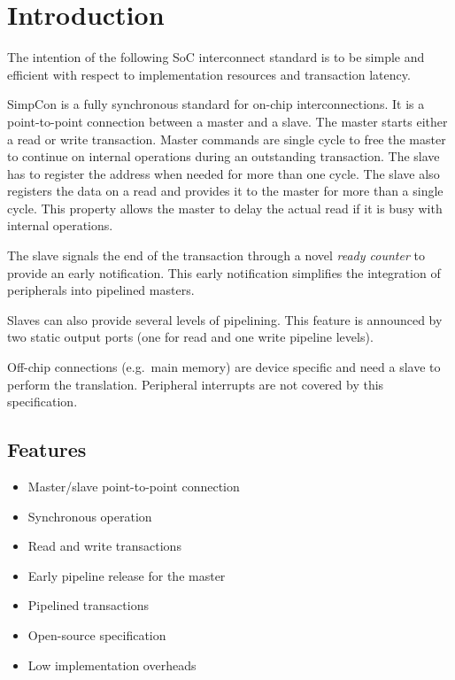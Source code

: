 
\section{Introduction}

The intention of the following SoC interconnect standard is to be
simple and efficient with respect to implementation resources and
transaction latency.

SimpCon is a fully synchronous standard for on-chip
interconnections. It is a point-to-point connection between a master
and a slave. The master starts either a read or write transaction.
Master commands are single cycle to free the master to continue on
internal operations during an outstanding transaction. The slave has
to register the address when needed for more than one cycle. The
slave also registers the data on a read and provides it to the
master for more than a single cycle. This property allows the master
to delay the actual read if it is busy with internal operations.

The slave signals the end of the transaction through a novel
\emph{ready counter} to provide an early notification. This early
notification simplifies the integration of peripherals into
pipelined masters.

Slaves can also provide several levels of pipelining. This feature
is announced by two static output ports (one for read and one write
pipeline levels).

Off-chip connections (e.g.\ main memory) are device specific and
need a slave to perform the translation. Peripheral interrupts are
not covered by this specification.

\subsection{Features}

\begin{itemize}
    \item Master/slave point-to-point connection
    \item Synchronous operation
    \item Read and write transactions
    \item Early pipeline release for the master
    \item Pipelined transactions
    \item Open-source specification
    \item Low implementation overheads
\end{itemize}

